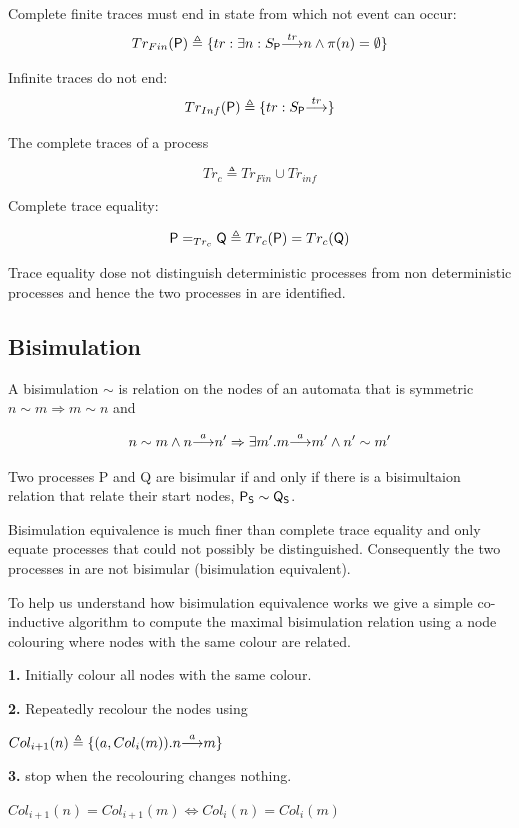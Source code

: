 \documentclass[]{article}
\begin{document}
 Complete finite traces must end in state from which not event can occur: 
 \[Tr_{Fin}({\sf P}) \triangleq \{ tr : \exists n : {S_{\sf P} }{\stackrel{tr}{\longrightarrow}}{n} \land \pi(n)=\emptyset\}\]
 
 Infinite traces  do not end:
 \[Tr_{Inf}({\sf P}) \triangleq \{ tr :  {S_{\sf P} }{\stackrel{tr}{\longrightarrow}}{} \}\]
 
 The  complete traces of a process 
 
 \[Tr_c \triangleq Tr_{Fin}\cup Tr_{inf}\]
 
 Complete trace equality:
 
 \[{\sf P} =_{Tr_c} {\sf Q} \triangleq Tr_c({\sf P}) = Tr_c({\sf Q})\]
 
Trace equality dose not distinguish deterministic processes from non deterministic processes  and hence the two processes in  are identified. 
 \subsection{Bisimulation}\label{sec:biscol}
  A bisimulation  $\sim$ is relation on the nodes of an automata  that is  symmetric  $n\sim m\Rightarrow m\sim n$  and  
 
 \[ n\sim m \land {n}{\stackrel{a}{\longrightarrow}}{n'} \Rightarrow \exists m' . {m}{\stackrel{a}{\longrightarrow}}{m'}  \land n'\sim m' \]
 
 Two processes {\sf P} and {\sf Q} are bisimular if and only if there is a bisimultaion relation that relate their start nodes, ${\sf P_S\sim Q_S}$. 
 
 Bisimulation equivalence is much finer than complete trace equality and  only equate processes that could not possibly be distinguished.  
 Consequently the two processes in  are not bisimular (bisimulation equivalent). 
 
 To help us understand how bisimulation equivalence works we give a simple co-inductive algorithm to compute the maximal  bisimulation relation  using a node colouring where  nodes with the same colour  are related.

\begin{center}\begin{minipage}{0.7\textwidth}

 {\bf 1.} Initially colour all nodes with the same colour.
 
{\bf 2.} Repeatedly recolour the nodes using
     \begin{center}
     $Col_{i+1}(n) \triangleq \{(a,Col_i(m)) .{n}{\stackrel{a}{\longrightarrow}}{m} \}$
     \end{center} 

{\bf 3.} \hspace{0.25in} stop when  the recolouring changes nothing.
\begin{center}
     $Col_{i+1}(n) =Col_{i+1}(m) \Leftrightarrow Col_{i}(n) =Col_{i}(m)$
     \end{center} 

\end{minipage} \end{center}
\end{document}
